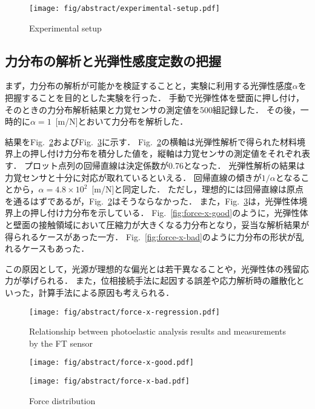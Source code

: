 \documentclass[a4paper,papersize,dvipdfmx]{mtabst}
\newcommand{\figref}[1]{Fig.~\ref{#1}}
\begin{document}
\begin{figure}[bt]
	\centering
	\texttt{[image: fig/abstract/experimental-setup.pdf]}
 	\caption{Experimental setup}\label{fig:experimental-setup}
\end{figure}

\subsection{力分布の解析と光弾性感度定数の把握}
まず，力分布の解析が可能かを検証することと，実験に利用する光弾性感度\(\alpha\)を把握することを目的とした実験を行った．
手動で光弾性体を壁面に押し付け，そのときの力分布解析結果と力覚センサの測定値を500組記録した．
その後，一時的に\(\alpha=1\)~[m/N]とおいて力分布を解析した．

結果を\figref{fig:force-x-regression}および\figref{fig:force-distribution}に示す．
\figref{fig:force-x-regression}の横軸は光弾性解析で得られた材料境界上の押し付け力分布を積分した値を，縦軸は力覚センサの測定値をそれぞれ表す．
プロット点列の回帰直線は決定係数が0.76となった．
光弾性解析の結果は力覚センサと十分に対応が取れているといえる．
回帰直線の傾きが\(1/\alpha\)となることから，\(\alpha=4.8\times10^2\)~[m/N]と同定した．
ただし，理想的には回帰直線は原点を通るはずであるが，\figref{fig:force-x-regression}はそうならなかった．
また，\figref{fig:force-distribution}は，光弾性体境界上の押し付け力分布を示している．
\figref{fig:force-x-good}のように，光弾性体と壁面の接触領域において圧縮力が大きくなる力分布となり，妥当な解析結果が得られるケースがあった一方．
\figref{fig:force-x-bad}のように力分布の形状が乱れるケースもあった．

この原因として，光源が理想的な偏光とは若干異なることや，光弾性体の残留応力が挙げられる．
また，位相接続手法に起因する誤差や応力解析時の離散化といった，計算手法による原因も考えられる．

\begin{figure}[bt]
	\centering
	\texttt{[image: fig/abstract/force-x-regression.pdf]}
 	\caption{Relationship between photoelastic analysis results and measurements by the FT sensor}\label{fig:force-x-regression}
\end{figure}

\begin{figure}[bt]
	\centering
    \begin{minipage}[t]{0.48\linewidth}
        \centering
        \texttt{[image: fig/abstract/force-x-good.pdf]}
        \label{fig:force-x-good}
    \end{minipage}
    \begin{minipage}[t]{0.48\linewidth}
        \centering
        \texttt{[image: fig/abstract/force-x-bad.pdf]}
        \label{fig:force-x-bad}
    \end{minipage}
    \caption{Force distribution}\label{fig:force-distribution}
\end{figure}
\end{document}
